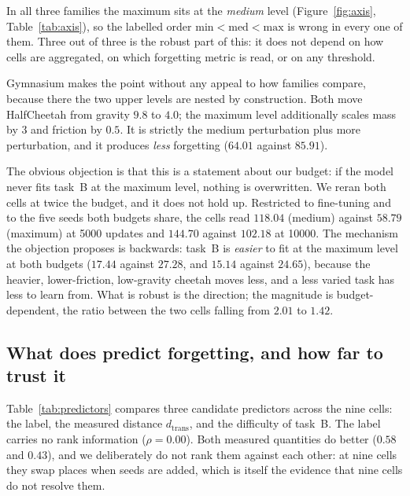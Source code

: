 \documentclass[11pt]{article}
\begin{document}
In all three families the maximum sits at the \emph{medium} level
(Figure~\ref{fig:axis}, Table~\ref{tab:axis}), so the labelled order
$\text{min} < \text{med} < \text{max}$ is wrong in every one of them. Three out
of three is the robust part of this: it does not depend on how cells are
aggregated, on which forgetting metric is read, or on any threshold.

Gymnasium makes the point without any appeal to how families compare, because
there the two upper levels are nested by construction. Both move HalfCheetah
from gravity $9.8$ to $4.0$; the maximum level additionally scales mass by $3$
and friction by $0.5$. It is strictly the medium perturbation plus more
perturbation, and it produces \emph{less} forgetting ($64.01$ against $85.91$).

The obvious objection is that this is a statement about our budget: if the
model never fits task~B at the maximum level, nothing is overwritten. We reran
both cells at twice the budget, and it does not hold up. Restricted to
fine-tuning and to the five seeds both budgets share, the cells read $118.04$
(medium) against $58.79$ (maximum) at 5000 updates and $144.70$ against
$102.18$ at 10000. The mechanism the objection proposes is backwards: task~B is
\emph{easier} to fit at the maximum level at both budgets ($17.44$ against
$27.28$, and $15.14$ against $24.65$), because the heavier, lower-friction,
low-gravity cheetah moves less, and a less varied task has less to learn from.
What is robust is the direction; the magnitude is budget-dependent, the ratio
between the two cells falling from $2.01$ to $1.42$.

\subsection{What does predict forgetting, and how far to trust it}
\label{sec:results:predictors}

\begin{table}[t]
  \centering
  
  \caption{The nine cells behind the rank correlations, and the correlations.
  Task-B difficulty is the held-out reconstruction error a model reaches on
  task~B after training on it.}
  \label{tab:predictors}
\end{table}

Table~\ref{tab:predictors} compares three candidate predictors across the nine
cells: the label, the measured distance $d_{\mathrm{trans}}$, and the
difficulty of task~B. The label carries no rank information ($\rho = 0.00$).
Both measured quantities do better ($0.58$ and $0.43$), and we deliberately do
not rank them against each other: at nine cells they swap places when seeds are
added, which is itself the evidence that nine cells do not resolve them.
\end{document}
